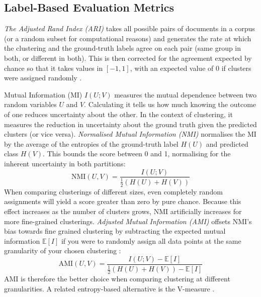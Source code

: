 \documentclass[11pt,a4paper,oneside]{report}
\begin{document}
\subsection{Label-Based Evaluation Metrics}\label{sec:labelbased}

\emph{The Adjusted Rand Index (ARI)} takes all possible pairs of documents in a corpus (or a random subset for computational reasons) and generates the rate at which the clustering and the ground-truth labels agree on each pair (same group in both, or different in both). This is then corrected for the agreement expected by chance so that it takes values in $[-1, 1]$, with an expected value of 0 if clusters were assigned randomly \citep{hubert1985comparing}.

Mutual Information (MI) $I(U;V)$ measures the mutual dependence between two random variables $U$ and $V$. Calculating it tells us how much knowing the outcome of one reduces uncertainty about the other. In the context of clustering, it measures the reduction in uncertainty about the ground truth given the predicted clusters (or vice versa). \emph{Normalised Mutual Information (NMI)} normalises the MI by the average of the entropies of the ground-truth label $H(U)$ and predicted class $H(V)$. This bounds the score between 0 and 1, normalising for the inherent uncertainty in both partitions:
\begin{equation}
\mathrm{NMI}(U,V) = \frac{I(U;V)}{\tfrac{1}{2}\left(H(U)+H(V)\right)}
\end{equation}
When comparing clusterings of different sizes, even completely random assignments will yield a score greater than zero by pure chance. Because this effect increases as the number of clusters grows, NMI artificially increases for more fine-grained clusterings. \emph{Adjusted Mutual Information (AMI)} offsets NMI's bias towards fine grained clustering by subtracting the expected mutual information $\mathbb{E}[I]$ if you were to randomly assign all data points at the same granularity of your chosen clustering \citep{vinh2010information}:
\begin{equation}
\mathrm{AMI}(U,V) = \frac{I(U;V) - \mathbb{E}[I]}{\tfrac{1}{2}\left(H(U)+H(V)\right) - \mathbb{E}[I]}
\end{equation}
AMI is therefore the better choice when comparing clustering at different granularities. A related entropy-based alternative is the V-measure \citep{rosenberg2007vmeasure}.
\end{document}
